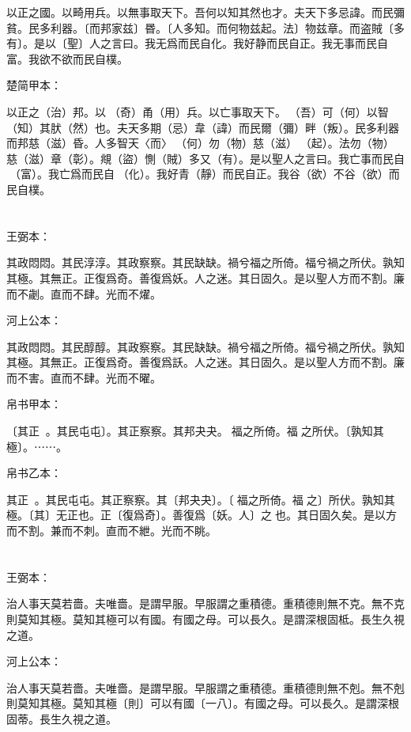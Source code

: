 \documentclass[a5paper]{ctexbook}
\begin{document}
    以正之國。以畸用兵。以無事取天下。吾何以知其然也才。夫天下多忌諱。而民彌貧。民多利器。〔而邦家兹〕昬。〔人多知。而何物兹起。法〕物兹章。而盗賊〔多有〕。是以〔聖〕人之言曰。我无爲而民自化。我好静而民自正。我无事而民自富。我欲不欲而民自樸。

    楚简甲本：

    以正之（治）邦。以󶵊（奇）甬（用）兵。以亡事取天下。󼾲（吾）可（何）以智（知）其肰（然）也。夫天多期（忌）韋（諱）而民爾（彌）畔（叛）。民多利器而邦慈（滋）昏。人多智天〈而〉𢦪（何）勿（物）慈（滋）󶵋（起）。法勿（物）慈（滋）章（彰）。覜（盜）惻（賊）多又（有）。是以聖人之言曰。我亡事而民自󶵌（富）。我亡爲而民自󶵍（化）。我好青（靜）而民自正。我谷（欲）不谷（欲）而民自樸。

    \chapter{}
    王弼本：

    其政悶悶。其民淳淳。其政察察。其民缺缺。禍兮福之所倚。福兮禍之所伏。孰知其極。其無正。正復爲奇。善復爲妖。人之迷。其日固久。是以聖人方而不割。廉而不劌。直而不肆。光而不燿。

    河上公本：

    其政悶悶。其民醇醇。其政察察。其民缺缺。禍兮福之所倚。福兮禍之所伏。孰知其極。其無正。正復爲奇。善復爲訞。人之迷。其日固久。是以聖人方而不割。廉而不害。直而不肆。光而不曜。

    帛书甲本：

    〔其正󱁅󱁅。其民屯屯〕。其正察察。其邦夬夬。𢢸福之所倚。福𢢸之所伏。〔孰知其極〕。⋯⋯。

    帛书乙本：

    其正󱁅󱁅。其民屯屯。其正察察。其〔邦夬夬〕。〔𢢸福之所倚。福𢢸之〕所伏。孰知其極。〔其〕无正也。正〔復爲奇〕。善復爲〔妖。人〕之𢘻也。其日固久矣。是以方而不割。兼而不刺。直而不紲。光而不眺。

    \chapter{}
    王弼本：

    治人事天莫若嗇。夫唯嗇。是謂早服。早服謂之重積德。重積德則無不克。無不克則莫知其極。莫知其極可以有國。有國之母。可以長久。是謂深根固柢。長生久視之道。

    河上公本：

    治人事天莫若嗇。夫唯嗇。是謂早服。早服謂之重積德。重積德則無不剋。無不剋則莫知其極。莫知其極〔則〕可以有國〔一八〕。有國之母。可以長久。是謂深根固蒂。長生久視之道。
\end{document}
